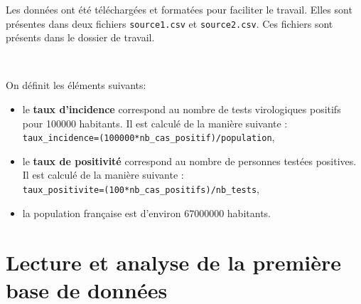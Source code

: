 Les données ont été téléchargées et formatées pour faciliter le travail. Elles sont présentes dans deux fichiers \verb?source1.csv? et \verb?source2.csv?. Ces fichiers sont présents dans le dossier de travail.

~\

On définit les éléments suivants:
\begin{itemize}
 \item le \textbf{taux d'incidence} correspond au nombre de tests virologiques positifs pour \num{100000} habitants. Il est calculé de la manière suivante : \\ \verb?taux_incidence=(100000*nb_cas_positif)/population?,
 \item le \textbf{taux de positivité} correspond au nombre de personnes testées positives. Il est calculé de la manière suivante : \\ \verb?taux_positivite=(100*nb_cas_positifs)/nb_tests?,
 \item la population française est d'environ \num{67000000} habitants.
\end{itemize}

\section*{Lecture et analyse de la première base de données}

